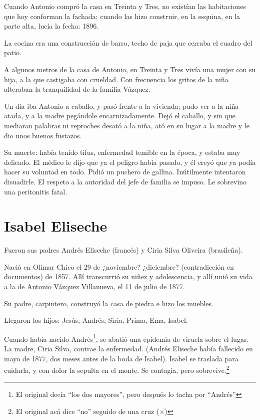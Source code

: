 \documentclass[a4paper]{article}
\begin{document}
\bigbreak{}

Cuando Antonio compró la casa en Treinta y Tres, no existían las habitaciones que hoy conforman la fachada; cuando las hizo construir, en la esquina, en la parte alta, lucía la fecha: 1896.

La cocina era una construcción de barro, techo de paja que cerraba el cuadro del patio.

\bigbreak{}

A algunos metros de la casa de Antonio, en Treinta y Tres vivía una mujer con su hija, a la que castigaba con crueldad. Con frecuencia los gritos de la niña alteraban la tranquilidad de la familia Vázquez.

Un día iba Antonio a caballo, y pasó frente a la vivienda; pudo ver a la niña atada, y a la madre pegándole encarnizadamente. Dejó el caballo, y sin que mediaran palabras ni reproches desató a la niña, ató en su lugar a la madre y le dio unos buenos fustazos.

\bigbreak{}

Su muerte: había tenido tifus, enfermedad temible en la época, y estaba muy delicado. El médico le dijo que ya el peligro había pasado, y él creyó que ya podía hacer su voluntad en todo. Pidió un puchero de gallina. Inútilmente intentaron disuadirle. El respeto a la autoridad del jefe de familia se impuso. Le sobrevino una peritonitis fatal.

\section{Isabel Eliseche}

Fueron sus padres Andrés Eliseche (francés) y Ciria Silva Oliveira (brasileña).

Nació en Olimar Chico el 29 de ¿noviembre? ¿diciembre? (contradicción en documentos) de 1857. Allí transcurrió su niñez y adolescencia, y allí unió su vida a la de Antonio Vázquez Villanueva, el 11 de julio de 1877.

Su padre, carpintero, construyó la casa de piedra e hizo los muebles.

Llegaron los hijos: Jesús, Andrés, Siria, Prima, Ema, Isabel.

Cuando había nacido Andrés\footnote{El original decía ``los dos mayores'', pero después lo tacha por ``Andrés''}, se abatió una epidemia de viruela sobre el lugar. La madre, Ciria Silva, contrae la enfermedad. (Andrés Eliseche había fallecido en mayo de 1877, dos meses antes de la boda de Isabel). Isabel se traslada para cuidarla, y con dolor la sepulta en el monte. Se contagia, pero sobrevive.\footnote{El original acá dice ``no'' seguido de una cruz ($\times$)}
\end{document}
